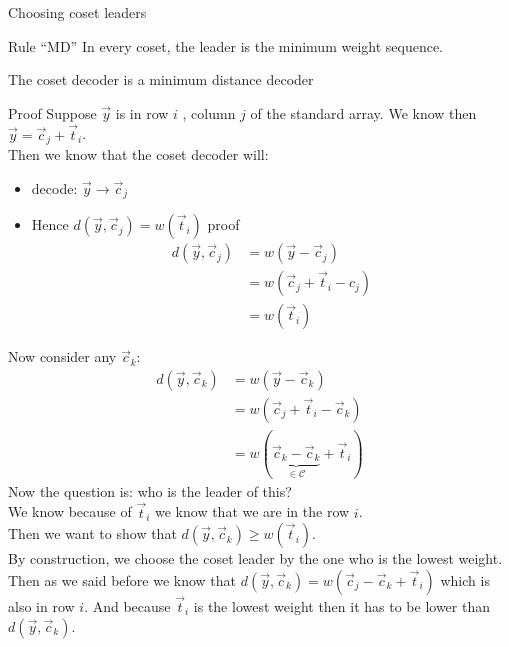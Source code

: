     
\begin{parag}{Choosing coset leaders}
   \begin{subparag}{Rule ``MD''}
       In every coset, the leader is the minimum weight sequence.
   \end{subparag}
   \begin{theoreme}
   The coset decoder is a minimum distance decoder
   \end{theoreme}
   \begin{subparag}{Proof}
       Suppose $\vec{y}$ is in row $i$ , column $j$ of the standard array. We know then $\vec{y} =  \vec{c}_j + \vec{t}_i$.\\
       Then we know that the coset decoder will:
       \begin{itemize}
           \item decode: $\vec{y} \to \vec{c}_j$
           \item Hence $d\left(\vec{y}, \vec{c}_j\right) =  w\left(\vec{t}_i\right)$ proof
               \begin{align*} 
                   d\left(\vec{y}, \vec{c}_j\right) &= w\left(\vec{y} - \vec{c}_j\right)\\
                                                    &= w \left(\vec{c}_j + \vec{t}_i - c_j\right)\\
                                                    &= w\left(\vec{t}_i\right)
               \end{align*}
       \end{itemize}
       Now consider any $\vec{c}_k$:
       \begin{align*} 
           d\left(\vec{y}, \vec{c}_k\right) &= w\left(\vec{y} - \vec{c}_k\right)\\
                                     &= w\left(\vec{c}_j + \vec{t}_i - \vec{c}_k\right)\\
                                     &= w\left(\underbrace{\vec{c}_k - \vec{c}_k }_{\in \mathcal{C}} + \vec{t}_i\right)
       \end{align*}
       Now the question is: who is the leader of this?\\
       We know because of $\vec{t}_i$ we know that we are in the row $i$.\\
       Then we want to show that $d\left(\vec{y}, \vec{c}_k\right) \geq w\left(\vec{t}_i\right)$.\\
       By construction, we choose the coset leader by the one who is the lowest weight. Then as we said before we know that $d\left(\vec{y}, \vec{c}_k\right) = w\left(\vec{c}_j - \vec{c}_k +\vec{t}_i\right)$ which is also in row $i$. And because $\vec{t}_i$ is the lowest weight then it has to be lower than $d\left(\vec{y}, \vec{c}_k\right)$.
   \end{subparag}
\end{parag}


